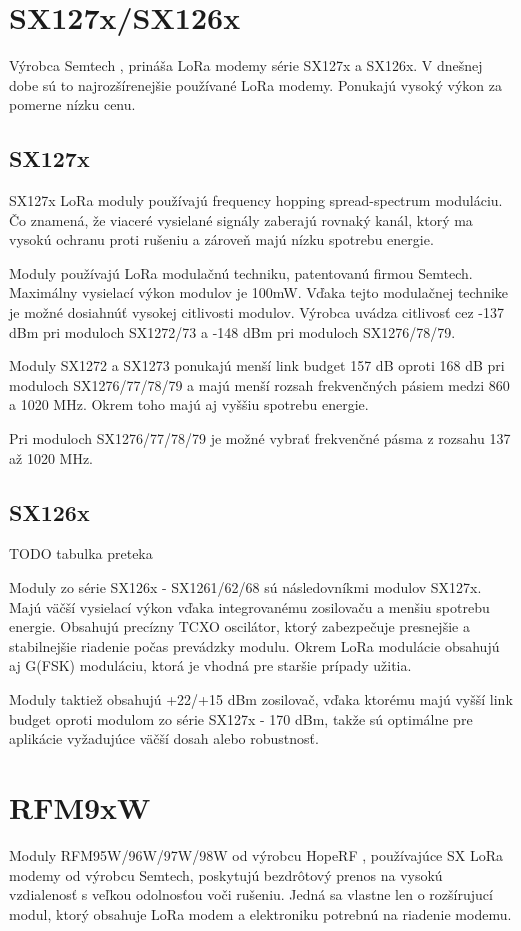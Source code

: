 \documentclass[slovak,master]{diploma}
\begin{document}
\section{SX127x/SX126x}
Výrobca Semtech \cite{semtech}, prináša LoRa modemy série SX127x a SX126x. V dnešnej dobe sú to najrozšírenejšie používané LoRa modemy.
Ponukajú vysoký výkon za pomerne nízku cenu.

\subsection{SX127x}

SX127x LoRa moduly používajú frequency hopping spread-spectrum moduláciu. Čo znamená, že viaceré vysielané signály zaberajú rovnaký kanál, ktorý ma 
vysokú ochranu proti rušeniu a zároveň majú nízku spotrebu energie.

Moduly používajú LoRa modulačnú techniku, patentovanú firmou Semtech. Maximálny vysielací výkon modulov je 100mW.
Vďaka tejto modulačnej technike je možné dosiahnúť vysokej citlivosti modulov.
Výrobca uvádza citlivosť cez -137 dBm pri moduloch SX1272/73 a -148 dBm pri moduloch SX1276/78/79.

Moduly SX1272 a SX1273 ponukajú menší link budget 157 dB oproti 168 dB pri moduloch SX1276/77/78/79 a majú menší rozsah frekvenčných pásiem medzi 860 a 1020 MHz.
Okrem toho majú aj vyššiu spotrebu energie.

Pri moduloch SX1276/77/78/79 je možné vybrať frekvenčné pásma z rozsahu 137 až 1020 MHz.

\subsection{SX126x}
TODO tabulka preteka

Moduly zo série SX126x - SX1261/62/68 sú následovníkmi modulov SX127x. Majú väčší vysielací výkon vďaka integrovanému zosilovaču a menšiu spotrebu energie. Obsahujú precízny TCXO oscilátor, 
ktorý zabezpečuje presnejšie a stabilnejšie riadenie počas prevádzky modulu. Okrem LoRa modulácie obsahujú aj G(FSK) moduláciu, ktorá je vhodná pre staršie 
prípady užitia.

Moduly taktiež obsahujú +22/+15 dBm zosilovač, vďaka ktorému majú vyšší link budget oproti modulom zo série SX127x - 170 dBm,
takže sú optimálne pre aplikácie vyžadujúce väčší dosah alebo robustnosť.

\section{RFM9xW}
Moduly RFM95W/96W/97W/98W od výrobcu HopeRF \cite{hoperf}, používajúce SX LoRa modemy od výrobcu Semtech, %
 poskytujú bezdrôtový prenos na vysokú vzdialenosť s veľkou odolnosťou voči rušeniu. 
 Jedná sa vlastne len o rozšírujucí modul, ktorý obsahuje LoRa modem a elektroniku potrebnú na riadenie modemu.
\end{document}
